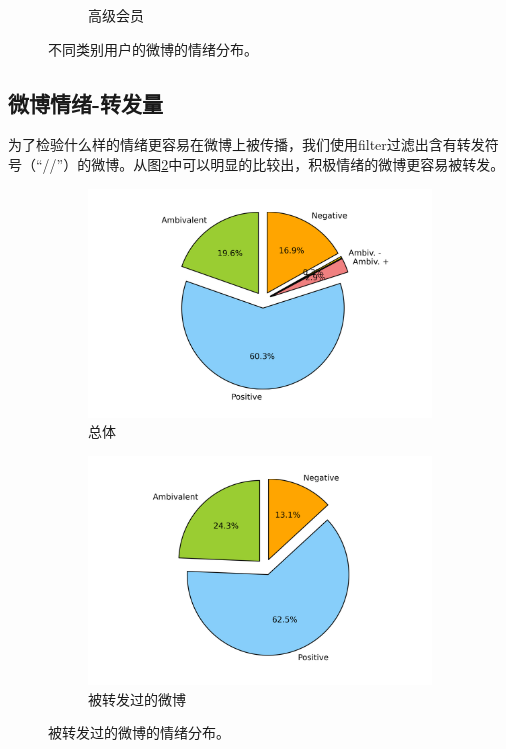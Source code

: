 \documentclass[12pt, oneside]{article}
\begin{document}
\begin{spacing}{1.5}
\begin{CJK}{UTF8}{gbsn}
\begin{figure}
\begin{subfigure}[b]{0.3\linewidth}
		\caption{高级会员}
	\end{subfigure}
	\caption{不同类别用户的微博的情绪分布。}
	\label{fig:emotion_identification}
\end{figure}


\subsection{微博情绪-转发量}
为了检验什么样的情绪更容易在微博上被传播，我们使用filter过滤出含有转发符号（“//”）的微博。从图\ref{fig:emotion_forward}中可以明显的比较出，积极情绪的微博更容易被转发。

\begin{figure}
	\centering
	\begin{subfigure}[b]{0.45\linewidth}
		\centering
		\includegraphics[trim = 1.5cm 0 1.5cm 0, clip = true, width=\textwidth]{../result/charts/emotion_identification_all}
		\caption{总体}
	\end{subfigure}
	\begin{subfigure}[b]{0.45\linewidth}
		\centering
		\includegraphics[trim = 1.5cm 0 1.5cm 0, clip = true, width=\textwidth]{../result/charts/emotion_forward}
		\caption{被转发过的微博}
	\end{subfigure}
	\caption{被转发过的微博的情绪分布。}
	\label{fig:emotion_forward}
\end{figure}



\end{CJK}
\end{spacing}
\end{document}
